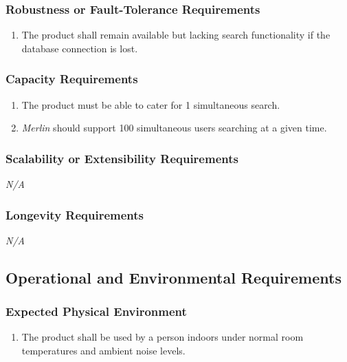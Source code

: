 \documentclass[]{article}
\newcommand{\merlin}{\textit{Merlin }}
\newcounter{saveenum}
\newcommand{\pauseEnum}{\setcounter{saveenum}{\value{enumi}}}
\newcommand{\resumeEnum}{\setcounter{enumi}{\value{saveenum}}}
\newcommand{\NA}{\indent\indent\emph{N/A}}
\begin{document}
\subsubsection{Robustness or Fault-Tolerance Requirements}
\label{ssub:robustness_or_fault_tolerance_requirements}
\begin{enumerate}[{PR}1. ]
	\resumeEnum
	\item The product shall remain available but lacking search functionality if the database connection is lost.
	\pauseEnum
\end{enumerate}

\subsubsection{Capacity Requirements}
\label{ssub:capacity_requirements}
\begin{enumerate}[{PR}1. ]
	\resumeEnum
	\item The product must be able to cater for 1 simultaneous search.
	\item \merlin should support 100 simultaneous users searching at a given time.
	\pauseEnum
\end{enumerate}

\subsubsection{Scalability or Extensibility Requirements}
\label{ssub:scalability_or_extensibility_requirements}
	\NA

\subsubsection{Longevity Requirements}
\label{ssub:longevity_requirements}
	\NA


\subsection{Operational and Environmental Requirements}
\label{sub:operational_and_environmental_requirements}

\subsubsection{Expected Physical Environment}
\label{ssub:expected_physical_environment}
\begin{enumerate}[{OE}1. ]
	\item The product shall be used by a person indoors under normal room temperatures and ambient noise levels.
	\pauseEnum
\end{enumerate}
\end{document}
